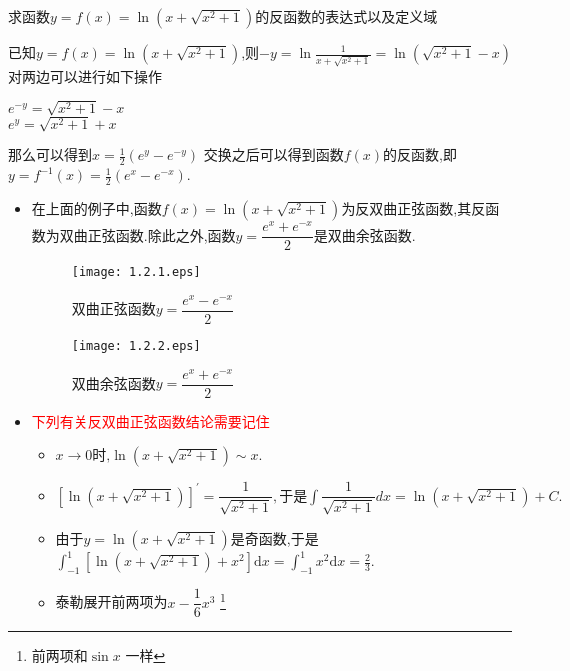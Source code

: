 \documentclass[8pt a4paper, oneside, UTF8]{ctexbook}  %
\begin{document}
\begin{sloppypar}
    \begin{problem}
    求函数$y=f(x)=\ln(x+\sqrt{x^2+1})$的反函数的表达式以及定义域
    \end{problem}
    \begin{solution}
        已知$y=f(x)=\ln(x+\sqrt{x^2+1})$,则$-y=\ln \frac{1}{x+\sqrt{x^2+1}}=\ln(\sqrt{x^2+1}-x)$\\
        对两边可以进行如下操作
        \begin{center}
            $e^{-y}=\sqrt{x^2+1}-x$\\
            $e^{y}=\sqrt{x^2+1}+x$\\
        \end{center}
        那么可以得到$x=\frac{1}{2}(e^y-e^{-y})$
        交换之后可以得到函数$f(x)$的反函数,即
        $y=f^{-1}(x)=\frac{1}{2}(e^x-e^{-x})$.
    \end{solution}
    \begin{note}
        \begin{itemize}
            \item 在上面的例子中,函数$f(x)=\ln(x+\sqrt{x^2+1})$为反双曲正弦函数,其反函数为双曲正弦函数.除此之外,函数$y=\dfrac{e^x+e^{-x}}{2}$是双曲余弦函数.
                  \begin{figure}[H]
                      \begin{minipage}[t]{0.5\linewidth}
                          \centering
                          \texttt{[image: 1.2.1.eps]}
                          \caption{双曲正弦函数$y=\dfrac{e^x-e^{-x}}{2}$}
                      \end{minipage}%
                      \begin{minipage}[t]{0.5\linewidth}
                          \centering
                          \texttt{[image: 1.2.2.eps]}
                          \caption{双曲余弦函数$y=\dfrac{e^x+e^{-x}}{2}$}
                      \end{minipage}
                  \end{figure}
            \item \textcolor{red}{下列有关反双曲正弦函数结论需要记住}
                  \begin{itemize}
                      \item $x\to0\text{时,}\ln\left(x+\sqrt{x^{2}+1}\right)\sim x.$
                      \item $\left[\ln\left(x+\sqrt{x^{2}+1}\right)\right]^{\prime}=\dfrac{1}{\sqrt{x^{2}+1}},\text{于是}\int\dfrac{1}{\sqrt{x^{2}+1}}dx=\ln\left(x+\sqrt{x^{2}+1}\right)+C.$
                      \item 由于$y=\ln\left(x+\sqrt{x^2+1}\right)$是奇函数,于是$\int_{-1}^1\left[\ln\left(x+\sqrt{x^2+1}\right)+x^2\right]\mathrm{d}x=\int_{-1}^1x^2\mathrm{d}x=\frac 23.$
                      \item 泰勒展开前两项为$x-\dfrac{1}{6}x^3$ \footnote{前两项和$\sin x$ 一样}
                  \end{itemize}
        \end{itemize}
    \end{note}

\end{sloppypar}
\end{document}
